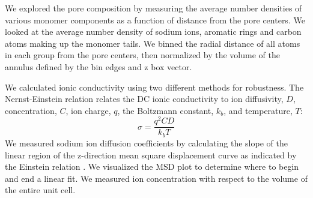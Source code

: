 \documentclass{article}
\newcommand{\angstrom}{\textup{\AA}}
\begin{document}
  
  We explored the pore composition by measuring the average number densities of
  various monomer components as a function of distance from the pore centers. We
  looked at the average number density of sodium ions, aromatic rings and carbon
  atoms making up the monomer tails. We binned the radial distance of all atoms
  in each group from the pore centers, then normalized by the volume of the
  annulus defined by the bin edges and z box vector.

  We calculated ionic conductivity using two different methods for robustness.
  The Nernst-Einstein relation relates the DC ionic conductivity to ion
  diffusivity, $D$, concentration, $C$, ion charge, $q$, the Boltzmann constant,
  $k_b$, and temperature, $T$: $$\sigma = \dfrac{q^2CD}{k_b T}$$ 
  We measured sodium ion diffusion coefficients by calculating the slope
  of the linear region of the z-direction mean square displacement curve as
  indicated by the Einstein relation \cite{einstein_investigations_1956}. We
  visualized the MSD plot to determine where to begin and end a linear fit. We
  measured ion concentration with respect to the volume of the entire unit cell. 
\end{document}
